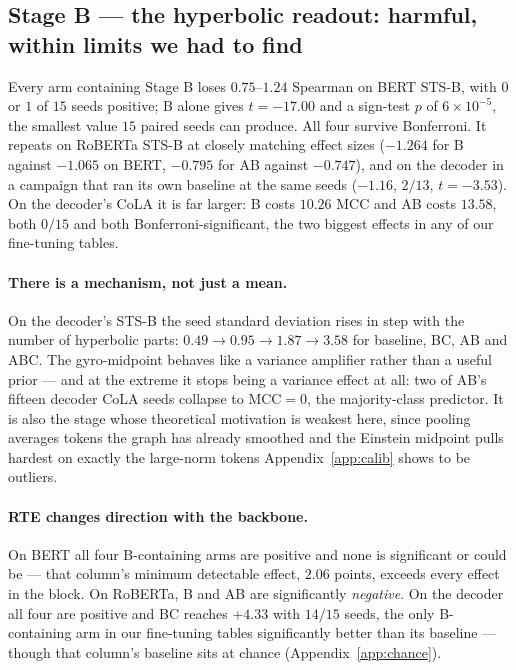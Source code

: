 \documentclass{article}
\begin{document}
\subsection{Stage B --- the hyperbolic readout: harmful, within limits we had to find}
\label{sec:stageB}

Every arm containing Stage B loses $0.75$--$1.24$ Spearman on BERT STS-B, with
$0$ or $1$ of $15$ seeds positive; B alone gives $t=-17.00$ and a sign-test $p$
of $6\times10^{-5}$, the smallest value $15$ paired seeds can produce. All four
survive Bonferroni. It repeats on RoBERTa STS-B at closely matching effect
sizes ($-1.264$ for B against $-1.065$ on BERT, $-0.795$ for AB against
$-0.747$), and on the decoder in a campaign that ran its own baseline at the
same seeds ($-1.16$, $2/13$, $t=-3.53$). On the decoder's CoLA it is far larger:
B costs $10.26$ MCC and AB costs $13.58$, both $0/15$ and both
Bonferroni-significant, the two biggest effects in any of our fine-tuning
tables.

\paragraph{There is a mechanism, not just a mean.} On the decoder's STS-B the
seed standard deviation rises in step with the number of hyperbolic parts:
$0.49 \rightarrow 0.95 \rightarrow 1.87 \rightarrow 3.58$ for baseline, BC, AB
and ABC. The gyro-midpoint behaves like a variance amplifier rather than a
useful prior --- and at the extreme it stops being a variance effect at all: two
of AB's fifteen decoder CoLA seeds collapse to $\mathrm{MCC}=0$, the
majority-class predictor. It is also the stage whose theoretical motivation is
weakest here, since pooling averages tokens the graph has already smoothed and
the Einstein midpoint pulls hardest on exactly the large-norm tokens
Appendix~\ref{app:calib} shows to be outliers.

\paragraph{RTE changes direction with the backbone.} On BERT all four
B-containing arms are positive and none is significant or could be --- that
column's minimum detectable effect, $2.06$ points, exceeds every effect in the
block. On RoBERTa, B and AB are significantly \emph{negative}. On the decoder
all four are positive and BC reaches $+4.33$ with $14/15$ seeds, the only
B-containing arm in our fine-tuning tables significantly better than its
baseline --- though that column's baseline sits at chance
(Appendix~\ref{app:chance}).
\end{document}
